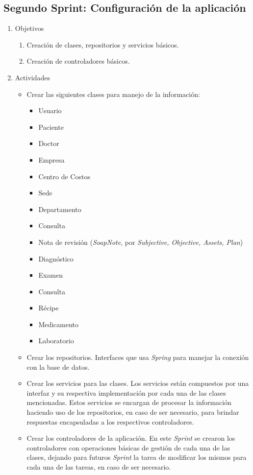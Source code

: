     \subsection{Segundo Sprint: Configuración de la aplicación}
    \begin{enumerate}
        \item Objetivos
        \begin{enumerate}
            \item Creación de clases, repositorios y servicios básicos.
            \item Creación de controladores básicos.
        \end{enumerate}
        \item Actividades
        \begin{itemize}
            \item Crear las siguientes clases para manejo de la información:
            \begin{itemize}
                \item Usuario
                \item Paciente
                \item Doctor
                \item Empresa
                \item Centro de Costos
                \item Sede
                \item Departamento
                \item Consulta
                \item Nota de revisión (\textit{SoapNote}, por \textit{Subjective, Objective, Assets, Plan})
                \item Diagnóstico
                \item Examen
                \item Consulta
                \item Récipe
                \item Medicamento
                \item Laboratorio
            \end{itemize}
            \item Crear los repositorios. Interfaces que usa \textit{Spring} para manejar la conexión con la base de datos.
            \item Crear los servicios para las clases. Los servicios están compuestos por una interfaz y su respectiva implementación por cada una de las clases mencionadas. Estos servicios se encargan de procesar la información haciendo uso de los repositorios, en caso de ser necesario, para brindar respuestas encapsuladas a los respectivos controladores.
            \item Crear los controladores de la aplicación. En este \textit{Sprint} se crearon los controladores con operaciones básicas de gestión de cada una de las clases, dejando para futuros \textit{Sprint} la tarea de modificar los mismos para cada una de las tareas, en caso de ser necesario.
        \end{itemize}
    \end{enumerate}
        
